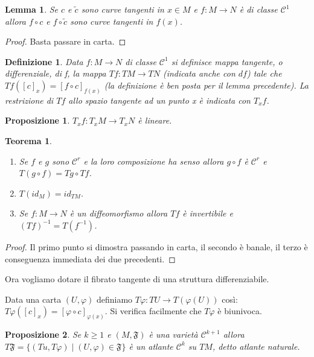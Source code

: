 \documentclass{article}
\newcommand{\PHI}{\varphi}
\newcommand{\composto}{\circ}
\newcommand{\inv}{^{-1}}
\newcommand{\ci}[1]{\mathscr{#1}}%
\newcommand{\g}[1]{\mathfrak{#1}}
\newtheorem{definizione}{ Definizione}
\newtheorem{teor}{ Teorema}
\newtheorem{proposizione}{ Proposizione}
\newtheorem*{lemma}{ Lemma}
\begin{document}
 \begin{lemma}
  Se $c$ e $\tilde{c}$ sono curve tangenti in $x\in M$ e $f:M\to N$ è di classe $\ci{C}^1$
  allora $f\composto c$ e $f\composto\tilde{c}$ sono curve tangenti in $f(x)$.
 \end{lemma}

 \begin{proof}
  Basta passare in carta.
 \end{proof}

 \begin{definizione}
  Data $f:M\to N$ di classe $\ci{C}^1$ si definisce mappa tangente, o differenziale,
  di f, la mappa $Tf:TM\to TN$ (indicata anche con $df$) tale che $Tf([c]_x)=[f\composto c]_{f(x)}$
  (la definizione è ben posta per il lemma precedente).
  La restrizione di $Tf$ allo spazio tangente ad un punto x è indicata con $T_xf$.
 \end{definizione}

 \begin{proposizione}
  $T_xf:T_xM\to T_xN$ è lineare.
 \end{proposizione}
 
 \begin{teor}
  \begin{enumerate}[label=\bf\Roman*)]
   \item Se $f$ e $g$ sono $\ci{C}^r$ e la loro composizione ha senso allora $g\composto f$
   è $\ci{C}^r$ e $T(g\composto f)=Tg\composto Tf$.
   \item $T(id_M)=id_{TM}$.
   \item Se $f:M\to N$ è un diffeomorfismo allora $Tf$ è invertibile e $(Tf)\inv=T(f\inv)$.
  \end{enumerate}
 \end{teor}

 \begin{proof}
  Il primo punto si dimostra passando in carta, il secondo è banale, il terzo è
  conseguenza immediata dei due precedenti.
 \end{proof}

 Ora vogliamo dotare il fibrato tangente di una struttura differenziabile.
 
 Data una carta $(U,\PHI)$ definiamo $T\PHI:TU\to T(\PHI(U))$ così:
 $T\PHI([c]_x)=[\PHI\composto c]_{\PHI(x)}$. Si verifica facilmente che $T\PHI$ è biunivoca.
 
 \begin{proposizione}
  Se $k\ge 1$ e $(M,\g{F})$ è una varietà $\ci{C}^{k+1}$ allora $T\g{F}=\{(Tu,T\PHI)\;|\;(U,\PHI)\in\g{F}\}$
  è un atlante $\ci{C}^k$ su $TM$, detto atlante naturale.
 \end{proposizione}
\end{document}
